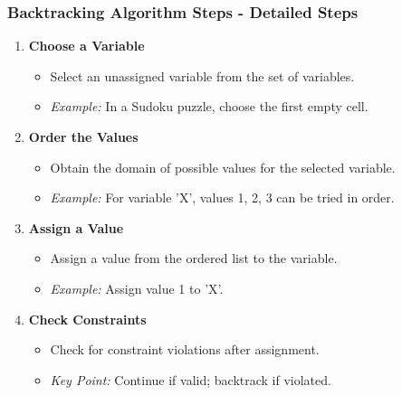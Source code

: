 \documentclass[aspectratio=169]{beamer}
\begin{document}
\begin{frame}[fragile]
    \frametitle{Backtracking Algorithm Steps - Detailed Steps}
    \begin{enumerate}
        \item \textbf{Choose a Variable}
            \begin{itemize}
                \item Select an unassigned variable from the set of variables.
                \item \textit{Example:} In a Sudoku puzzle, choose the first empty cell.
            \end{itemize}
        \item \textbf{Order the Values}
            \begin{itemize}
                \item Obtain the domain of possible values for the selected variable.
                \item \textit{Example:} For variable 'X', values {1, 2, 3} can be tried in order.
            \end{itemize}
        \item \textbf{Assign a Value}
            \begin{itemize}
                \item Assign a value from the ordered list to the variable.
                \item \textit{Example:} Assign value 1 to 'X'.
            \end{itemize}
        \item \textbf{Check Constraints}
            \begin{itemize}
                \item Check for constraint violations after assignment.
                \item \textit{Key Point:} Continue if valid; backtrack if violated.
            \end{itemize}
    \end{enumerate}
\end{frame}
\end{document}
